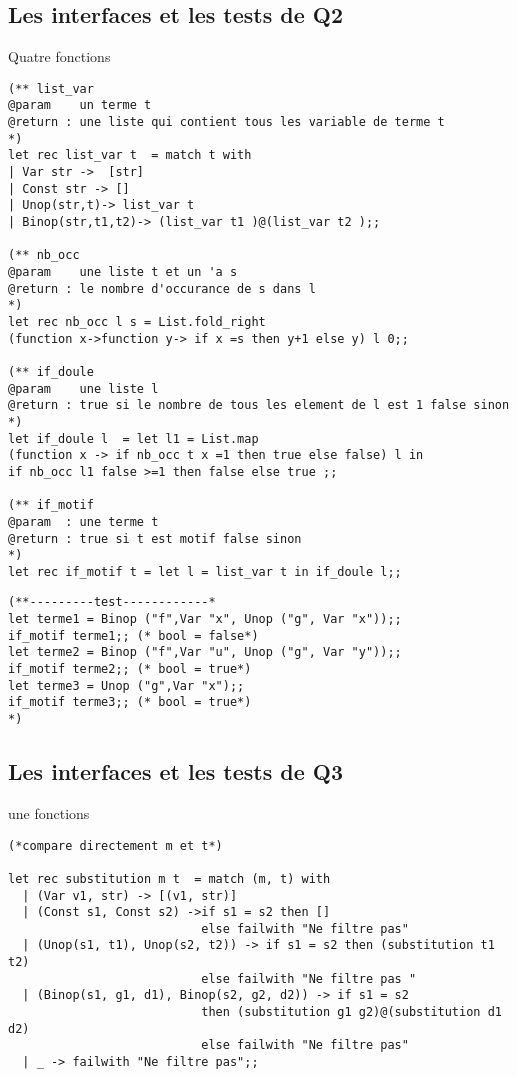 \documentclass[12pt]{amsart}
\begin{document}
\subsection{Les interfaces et les tests de Q2}   Quatre fonctions
\begin{lstlisting}
(** list_var
@param    un terme t
@return : une liste qui contient tous les variable de terme t
*)
let rec list_var t  = match t with
| Var str ->  [str] 
| Const str -> []
| Unop(str,t)-> list_var t 
| Binop(str,t1,t2)-> (list_var t1 )@(list_var t2 );;

(** nb_occ
@param    une liste t et un 'a s
@return : le nombre d'occurance de s dans l
*)
let rec nb_occ l s = List.fold_right
(function x->function y-> if x =s then y+1 else y) l 0;;

(** if_doule
@param    une liste l
@return : true si le nombre de tous les element de l est 1 false sinon 
*)
let if_doule l  = let l1 = List.map 
(function x -> if nb_occ t x =1 then true else false) l in 
if nb_occ l1 false >=1 then false else true ;;

(** if_motif
@param  : une terme t
@return : true si t est motif false sinon
*)
let rec if_motif t = let l = list_var t in if_doule l;;  

    \end{lstlisting}
  \begin{lstlisting}
(**---------test------------*
let terme1 = Binop ("f",Var "x", Unop ("g", Var "x"));;
if_motif terme1;; (* bool = false*)
let terme2 = Binop ("f",Var "u", Unop ("g", Var "y"));;
if_motif terme2;; (* bool = true*)
let terme3 = Unop ("g",Var "x");;
if_motif terme3;; (* bool = true*)
*)
 \end{lstlisting}   
              
\subsection{Les interfaces et les tests de Q3}   une fonctions

\begin{lstlisting}
(*compare directement m et t*)

let rec substitution m t  = match (m, t) with
  | (Var v1, str) -> [(v1, str)]
  | (Const s1, Const s2) ->if s1 = s2 then [] 
                           else failwith "Ne filtre pas" 
  | (Unop(s1, t1), Unop(s2, t2)) -> if s1 = s2 then (substitution t1 t2) 
                           else failwith "Ne filtre pas "
  | (Binop(s1, g1, d1), Binop(s2, g2, d2)) -> if s1 = s2 
                           then (substitution g1 g2)@(substitution d1 d2) 
                           else failwith "Ne filtre pas"
  | _ -> failwith "Ne filtre pas";;
 \end{lstlisting}              
 
\end{document}
